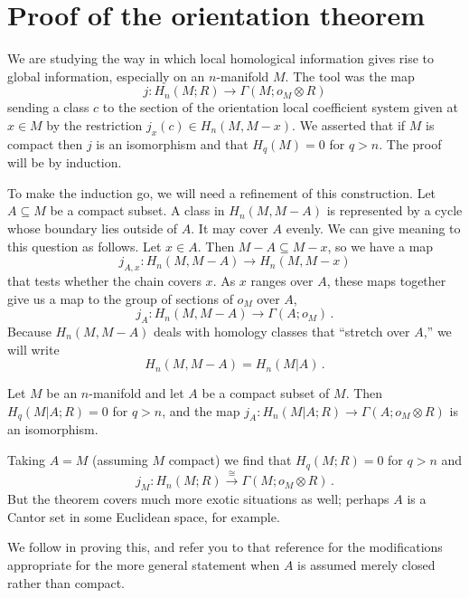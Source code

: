 \section{Proof of the orientation theorem}

We are studying the way in which local homological information gives rise
to global information, especially on an $n$-manifold $M$. The tool was the map
\[
j:H_n(M;R)\to\Gamma(M;o_M\otimes R)
\]
sending a class $c$ to the section of the orientation local coefficient
system given at $x\in M$ by the restriction $j_x(c)\in H_n(M,M-x)$. 
We asserted that if $M$ is compact then $j$ is an isomorphism and that
$H_q(M)=0$ for $q>n$. The proof will be by induction.

To make the induction go, we will need a refinement of this construction.
Let $A\subseteq M$ be a compact subset. A class in
$H_n(M,M-A)$ is represented by a cycle whose boundary lies outside of $A$. 
It may cover $A$ evenly. We can give meaning to this question as follows.
Let $x\in A$. Then $M-A\subseteq M-x$, so we have a map
\[
j_{A,x}:H_n(M,M-A)\to H_n(M,M-x)
\]
that tests whether the chain covers $x$. As $x$ ranges over $A$, 
these maps together give us a map to the group of sections of $o_M$ over $A$,
\[
j_A:H_n(M,M-A)\to\Gamma(A;o_M)\,.
\]
Because $H_n(M,M-A)$ deals with homology classes that ``stretch over $A$,''
we will write
\[
H_n(M,M-A)=H_n(M|A)\,.
\]
\begin{theorem} Let $M$ be an $n$-manifold and let $A$ be a compact subset 
of $M$. Then $H_q(M|A;R)=0$ for $q>n$, and the map 
$j_A:H_n(M|A;R)\to\Gamma(A;o_M\otimes R)$ is an isomorphism.
\label{thm-fundamental-class}
\end{theorem}
Taking $A=M$ (assuming $M$ compact) we find that $H_q(M;R)=0$ for $q>n$ and 
\[
j_M:H_n(M;R)\xrightarrow{\cong}\Gamma(M;o_M\otimes R)\,.
\]
But the theorem covers much more exotic situations as well; perhaps $A$ is 
a Cantor set in some Euclidean space, for example.

We follow \cite{bredon} in proving this, 
and refer you to that reference for the modifications appropriate for
the more general statement when $A$ is assumed merely closed rather than
compact.


